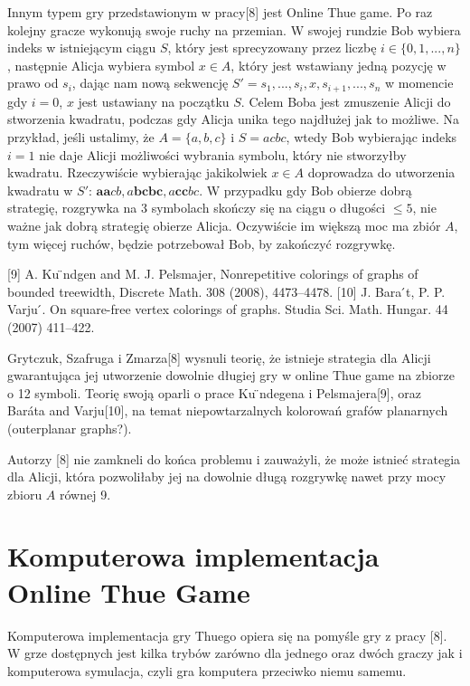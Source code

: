 \documentclass[document]{xmgr}
\begin{document}
Innym typem gry przedstawionym w pracy[8] jest Online Thue game. Po raz  
kolejny gracze wykonują swoje ruchy na przemian. W swojej rundzie Bob wybiera indeks w istniejącym ciągu $S$, który jest sprecyzowany przez 
liczbę $i \in \{0, 1, ..., n\}$, następnie Alicja wybiera symbol $x \in A
$, który jest wstawiany jedną pozycję w prawo od $s_i$, dając nam nową sekwencję $S' = s_1, ..., s_i, x, s_{i+1}, ...,s_n$ w momencie gdy $i = 0$, $x$ jest ustawiany na początku $S$. Celem Boba jest zmuszenie Alicji do stworzenia kwadratu, podczas gdy Alicja unika tego najdłużej jak to możliwe. Na przykład, jeśli ustalimy, że $A = \{a, b, c\}$ i $S = acbc$, wtedy Bob wybierając indeks $i = 1$ nie daje Alicji możliwości wybrania symbolu, który nie stworzyłby kwadratu. Rzeczywiście wybierając jakikolwiek $x \in A$ doprowadza do utworzenia kwadratu w $S'$: $\textbf{aa}cb, a\textbf{bcbc}, a\textbf{cc}bc$. W przypadku gdy Bob obierze dobrą strategię, rozgrywka na 3 symbolach skończy się na ciągu o długości $\leq 5$, nie ważne jak dobrą strategię obierze Alicja. Oczywiście im większą moc ma zbiór $A$, tym więcej ruchów, będzie potrzebował Bob, by zakończyć rozgrywkę. 

[9] A. Ku ̈ndgen and M. J. Pelsmajer, Nonrepetitive colorings of graphs of bounded treewidth, Discrete Math. 308 (2008), 4473–4478. [10] J. Bara ́t, P. P. Varju ́. On square-free vertex colorings of graphs. Studia Sci. Math. Hungar. 44 (2007) 411–422. 

Grytczuk, Szafruga i Zmarza[8] wysnuli teorię, że istnieje strategia dla Alicji gwarantująca jej utworzenie dowolnie długiej gry w online Thue game na zbiorze o 12 symboli. Teorię swoją oparli o prace Ku ̈ndegena i Pelsmajera[9], oraz Baráta and Varju[10], na temat niepowtarzalnych kolorowań grafów planarnych (outerplanar graphs?).

Autorzy [8] nie zamkneli do końca problemu i zauważyli, że może istnieć strategia dla Alicji, która pozwoliłaby jej na dowolnie długą rozgrywkę nawet przy mocy zbioru $A$ równej 9.


\section{Komputerowa implementacja Online Thue Game}

Komputerowa implementacja gry Thuego opiera się na pomyśle gry z pracy [8]. W grze dostępnych jest kilka trybów zarówno dla jednego oraz dwóch graczy jak i komputerowa symulacja, czyli gra komputera przeciwko niemu samemu.
\end{document}
